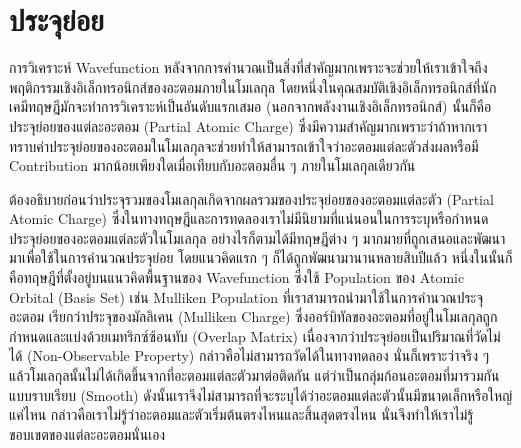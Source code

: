 \section{ประจุย่อย}
\label{sec:partial_charge}

การวิเคราะห์ Wavefunction หลังจากการคำนวณเป็นสิ่งที่สำคัญมากเพราะจะช่วยให้เราเข้าใจถึงพฤติกรรมเชิงอิเล็กทรอนิกส์ของอะตอมภายในโมเลกุล โดยหนึ่งในคุณสมบัติเชิงอิเล็กทรอนิกส์ที่นักเคมีทฤษฎีมักจะทำการวิเคราะห์เป็นอันดับแรกเสมอ (นอกจากพลังงานเชิงอิเล็กทรอนิกส์) นั้นก็คือประจุย่อยของแต่ละอะตอม (Partial Atomic Charge) ซึ่งมีความสำคัญมากเพราะว่าถ้าหากเราทราบค่าประจุย่อยของอะตอมในโมเลกุลจะช่วยทำให้สามารถเข้าใจว่าอะตอมแต่ละตัวส่งผลหรือมี Contribution มากน้อยเพียงใดเมื่อเทียบกับอะตอมอื่น ๆ ภายในโมเลกุลเดียวกัน

ต้องอธิบายก่อนว่าประจุรวมของโมเลกุลเกิดจากผลรวมของประจุย่อยของอะตอมแต่ละตัว (Partial Atomic Charge) ซึ่งในทางทฤษฎีและการทดลองเราไม่มีนิยามที่แน่นอนในการระบุหรือกำหนดประจุย่อยของอะตอมแต่ละตัวในโมเลกุล อย่างไรก็ตามได้มีทฤษฎีต่าง ๆ มากมายที่ถูกเสนอและพัฒนามาเพื่อใช้ในการคำนวณประจุย่อย โดยแนวคิดแรก ๆ ก็ได้ถูกพัฒนามานานหลายสิบปีแล้ว หนึ่งในนั้นก็คือทฤษฎีที่ตั้งอยู่บนแนวคิดพื้นฐานของ Wavefunction ซึ่งใช้ Population ของ Atomic Orbital (Basis Set) เช่น Mulliken Population ที่เราสามารถนำมาใช้ในการคำนวณประจุอะตอม เรียกว่าประจุของมัลลิเคน (Mulliken Charge) ซึ่งออร์บิทัลของอะตอมที่อยู่ในโมเลกุลถูกกำหนดและแบ่งด้วยเมทริกซ์ซ้อนทับ (Overlap Matrix) เนื่องจากว่าประจุย่อยเป็นปริมาณที่วัดไม่ได้ (Non-Observable Property) กล่าวคือไม่สามารถวัดได้ในทางทดลอง นั่นก็เพราะว่าจริง ๆ แล้วโมเลกุลนั้นไม่ได้เกิดขึ้นจากที่อะตอมแต่ละตัวมาต่อติดกัน แต่ว่าเป็นกลุ่มก้อนอะตอมที่มารวมกันแบบราบเรียบ (Smooth) ดังนั้นเราจึงไม่สามารถที่จะระบุได้ว่าอะตอมแต่ละตัวนั้นมีขนาดเล็กหรือใหญ่แค่ไหน กล่าวคือเราไม่รู้ว่าอะตอมและตัวเริ่มต้นตรงไหนและสิ้นสุดตรงไหน นั่นจึงทำให้เราไม่รู้ขอบเขตของแต่ละอะตอมนั่นเอง


